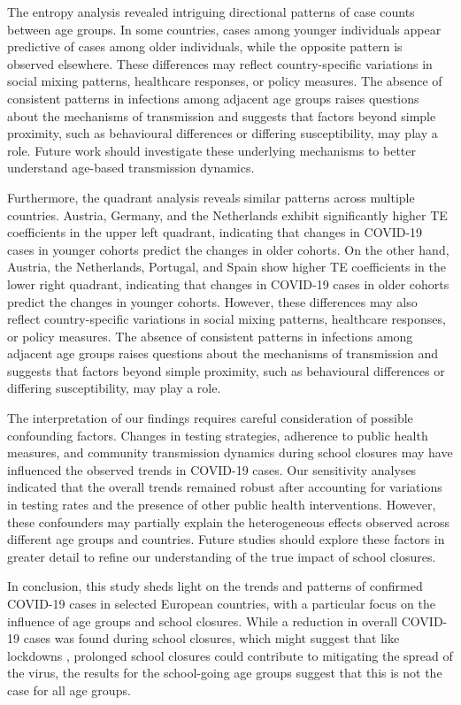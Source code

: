 \documentclass[]{interact}
\theoremstyle{plain}%
\theoremstyle{definition}
\theoremstyle{remark}
\begin{document}
The entropy analysis revealed intriguing directional patterns of case counts between age groups. In some countries, cases among younger individuals appear predictive of cases among older individuals, while the opposite pattern is observed elsewhere. These differences may reflect country-specific variations in social mixing patterns, healthcare responses, or policy measures. The absence of consistent patterns in infections among adjacent age groups raises questions about the mechanisms of transmission and suggests that factors beyond simple proximity, such as behavioural differences or differing susceptibility, may play a role. Future work should investigate these underlying mechanisms to better understand age-based transmission dynamics.

Furthermore, the quadrant analysis reveals similar patterns across multiple countries. Austria, Germany, and the Netherlands exhibit significantly higher TE coefficients in the upper left quadrant, indicating that changes in COVID-19 cases in younger cohorts predict the changes in older cohorts. On the other hand, Austria, the Netherlands, Portugal, and Spain show higher TE coefficients in the lower right quadrant, indicating that changes in COVID-19 cases in older cohorts predict the changes in younger cohorts. However, these differences may also reflect country-specific variations in social mixing patterns, healthcare responses, or policy measures. The absence of consistent patterns in infections among adjacent age groups raises questions about the mechanisms of transmission and suggests that factors beyond simple proximity, such as behavioural differences or differing susceptibility, may play a role.

The interpretation of our findings requires careful consideration of possible confounding factors. Changes in testing strategies, adherence to public health measures, and community transmission dynamics during school closures may have influenced the observed trends in COVID-19 cases. Our sensitivity analyses indicated that the overall trends remained robust after accounting for variations in testing rates and the presence of other public health interventions. However, these confounders may partially explain the heterogeneous effects observed across different age groups and countries. Future studies should explore these factors in greater detail to refine our understanding of the true impact of school closures.

In conclusion, this study sheds light on the trends and patterns of confirmed COVID-19 cases in selected European countries, with a particular focus on the influence of age groups and school closures. While a reduction in overall COVID-19 cases was found during school closures, which might suggest that like lockdowns \citep{alfano2020efficacy, molefi2021impact}, prolonged school closures could contribute to mitigating the spread of the virus, the results for the school-going age groups suggest that this is not the case for all age groups.
\end{document}
